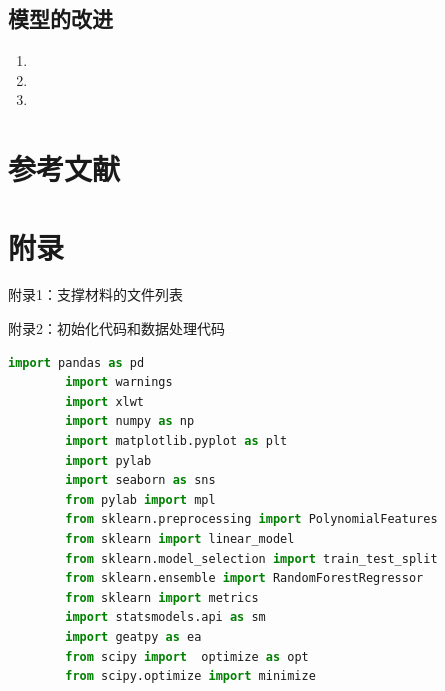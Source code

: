 \documentclass[a4paper]{article}
\begin{document}
	\subsection{模型的改进}
	\begin{enumerate}
		\item 
		\item 
		\item 
	\end{enumerate}
	
	\section{参考文献}
	\vspace{-2em} %
	\begin{thebibliography}{9}  
	\end{thebibliography}
	
	\newpage
	\section*{附录}
	
	附录1：支撑材料的文件列表
	
	
	附录2：初始化代码和数据处理代码
	\begin{lstlisting}[language=python,columns=fullflexible,frame=shadowbox]
		import pandas as pd
		import warnings
		import xlwt
		import numpy as np
		import matplotlib.pyplot as plt
		import pylab
		import seaborn as sns
		from pylab import mpl
		from sklearn.preprocessing import PolynomialFeatures
		from sklearn import linear_model
		from sklearn.model_selection import train_test_split
		from sklearn.ensemble import RandomForestRegressor
		from sklearn import metrics
		import statsmodels.api as sm
		import geatpy as ea
		from scipy import  optimize as opt
		from scipy.optimize import minimize
	\end{lstlisting}
	
\end{document}
